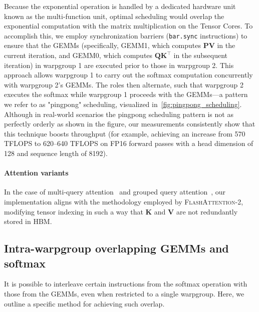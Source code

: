 Because the exponential operation is handled by a dedicated hardware unit known as the multi-function unit, optimal scheduling would overlap the exponential computation with the matrix multiplication on the Tensor Cores. To accomplish this, we employ synchronization barriers (\texttt{bar.sync} instructions) to ensure that the GEMMs (specifically, GEMM1, which computes $\mathbf{P} \mathbf{V}$ in the current iteration, and GEMM0, which computes $\mathbf{Q} \mathbf{K}^\top$ in the subsequent iteration) in warpgroup 1 are executed prior to those in warpgroup 2. This approach allows warpgroup 1 to carry out the softmax computation concurrently with warpgroup 2’s GEMMs. The roles then alternate, such that warpgroup 2 executes the softmax while warpgroup 1 proceeds with the GEMMs—a pattern we refer to as "pingpong" scheduling, visualized in~\cref{fig:pingpong_scheduling}. Although in real-world scenarios the pingpong scheduling pattern is not as perfectly orderly as shown in the figure, our measurements consistently show that this technique boosts throughput (for example, achieving an increase from 570 TFLOPS to 620–640 TFLOPS on FP16 forward passes with a head dimension of 128 and sequence length of 8192).

\paragraph{Attention variants} In the case of multi-query attention~\citep{shazeer2019fast} and grouped query attention~\citep{ainslie2023gqa}, our implementation aligns with the methodology employed by \textsc{FlashAttention-2}, modifying tensor indexing in such a way that $\mathbf{K}$ and $\mathbf{V}$ are not redundantly stored in HBM.

\subsection{Intra-warpgroup overlapping GEMMs and softmax}

It is possible to interleave certain instructions from the softmax operation with those from the GEMMs, even when restricted to a single warpgroup. Here, we outline a specific method for achieving such overlap.

